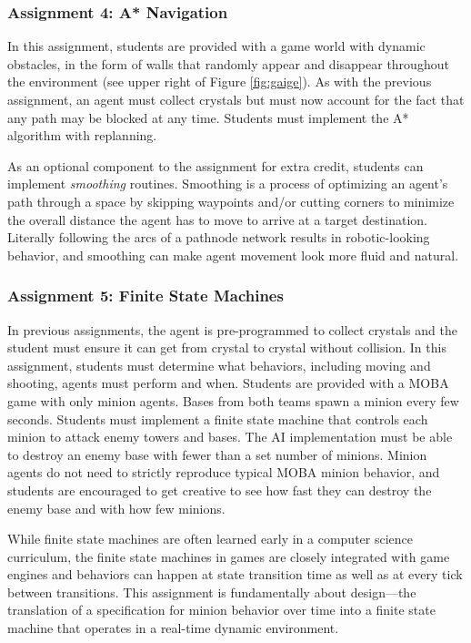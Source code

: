 \documentclass[letterpaper]{article}
\begin{document}
\subsubsection{Assignment 4: A* Navigation}
In this assignment, students are provided with a game world with dynamic obstacles, in the form of walls that randomly appear and disappear throughout the environment (see upper right of Figure \ref{fig:gaige}).
As with the previous assignment, an agent must collect crystals but must now account for the fact that any path may be blocked at any time. 
Students must implement the A* algorithm with replanning.

As an optional component to the assignment for extra credit, students can implement {\em smoothing} routines. 
Smoothing is a process of optimizing an agent's path through a space by skipping waypoints and/or cutting corners to minimize the overall distance the agent has to move to arrive at a target destination.
Literally following the arcs of a pathnode network results in robotic-looking behavior, and smoothing can make agent movement look more fluid and natural.

\subsubsection{Assignment 5: Finite State Machines}
In previous assignments, the agent is pre-programmed to collect crystals and the student must ensure it can get from crystal to crystal without collision.
In this assignment, students must determine what behaviors, including moving and shooting, agents must perform and when.
Students are provided with a MOBA game with only minion agents.
Bases from both teams spawn a minion every few seconds.
Students must implement a finite state machine that controls each minion to attack enemy towers and bases.
The AI implementation must be able to destroy an enemy base with fewer than a set number of minions.
Minion agents do not need to strictly reproduce typical MOBA minion behavior, and students are encouraged to get creative to see how fast they can destroy the enemy base and with how few minions.

While finite state machines are often learned early in a computer science curriculum, the finite state machines in games are closely integrated with game engines and behaviors can happen at state transition time as well as at every tick between  transitions.
This assignment is fundamentally about design---the translation of a specification for minion behavior over time into a finite state machine that operates in a real-time dynamic environment.
\end{document}
